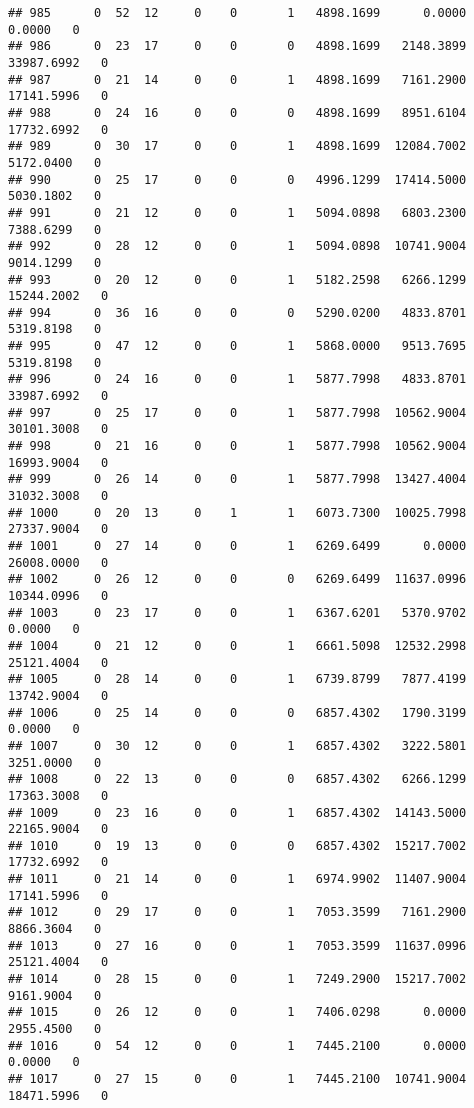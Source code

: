 \documentclass[
]{article}
\begin{document}
\begin{enumerate}
\begin{verbatim}
## 985      0  52  12     0    0       1   4898.1699      0.0000      0.0000   0
## 986      0  23  17     0    0       0   4898.1699   2148.3899  33987.6992   0
## 987      0  21  14     0    0       1   4898.1699   7161.2900  17141.5996   0
## 988      0  24  16     0    0       0   4898.1699   8951.6104  17732.6992   0
## 989      0  30  17     0    0       1   4898.1699  12084.7002   5172.0400   0
## 990      0  25  17     0    0       0   4996.1299  17414.5000   5030.1802   0
## 991      0  21  12     0    0       1   5094.0898   6803.2300   7388.6299   0
## 992      0  28  12     0    0       1   5094.0898  10741.9004   9014.1299   0
## 993      0  20  12     0    0       1   5182.2598   6266.1299  15244.2002   0
## 994      0  36  16     0    0       0   5290.0200   4833.8701   5319.8198   0
## 995      0  47  12     0    0       1   5868.0000   9513.7695   5319.8198   0
## 996      0  24  16     0    0       1   5877.7998   4833.8701  33987.6992   0
## 997      0  25  17     0    0       1   5877.7998  10562.9004  30101.3008   0
## 998      0  21  16     0    0       1   5877.7998  10562.9004  16993.9004   0
## 999      0  26  14     0    0       1   5877.7998  13427.4004  31032.3008   0
## 1000     0  20  13     0    1       1   6073.7300  10025.7998  27337.9004   0
## 1001     0  27  14     0    0       1   6269.6499      0.0000  26008.0000   0
## 1002     0  26  12     0    0       0   6269.6499  11637.0996  10344.0996   0
## 1003     0  23  17     0    0       1   6367.6201   5370.9702      0.0000   0
## 1004     0  21  12     0    0       1   6661.5098  12532.2998  25121.4004   0
## 1005     0  28  14     0    0       1   6739.8799   7877.4199  13742.9004   0
## 1006     0  25  14     0    0       0   6857.4302   1790.3199      0.0000   0
## 1007     0  30  12     0    0       1   6857.4302   3222.5801   3251.0000   0
## 1008     0  22  13     0    0       0   6857.4302   6266.1299  17363.3008   0
## 1009     0  23  16     0    0       1   6857.4302  14143.5000  22165.9004   0
## 1010     0  19  13     0    0       0   6857.4302  15217.7002  17732.6992   0
## 1011     0  21  14     0    0       1   6974.9902  11407.9004  17141.5996   0
## 1012     0  29  17     0    0       1   7053.3599   7161.2900   8866.3604   0
## 1013     0  27  16     0    0       1   7053.3599  11637.0996  25121.4004   0
## 1014     0  28  15     0    0       1   7249.2900  15217.7002   9161.9004   0
## 1015     0  26  12     0    0       1   7406.0298      0.0000   2955.4500   0
## 1016     0  54  12     0    0       1   7445.2100      0.0000      0.0000   0
## 1017     0  27  15     0    0       1   7445.2100  10741.9004  18471.5996   0

\end{verbatim}
\end{enumerate}
\end{document}

